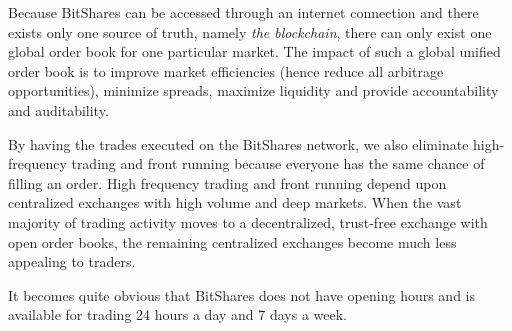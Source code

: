 Because BitShares can be accessed through an internet connection and there
exists only one source of truth, namely \emph{the blockchain}, there can only
exist one global order book for one particular market. The impact of such a
global unified order book is to improve market efficiencies (hence reduce all
arbitrage opportunities), minimize spreads, maximize liquidity and provide
accountability and auditability. 

By having the trades executed on the BitShares network, we also eliminate
high-frequency trading and front running because everyone has the same chance
of filling an order. High frequency trading and front running depend upon
centralized exchanges with high volume and deep markets. When the vast majority
of trading activity moves to a decentralized, trust-free exchange with open
order books, the remaining centralized exchanges become much less appealing to
traders.

It becomes quite obvious that BitShares does not have opening hours and is
available for trading 24 hours a day and 7 days a week.

